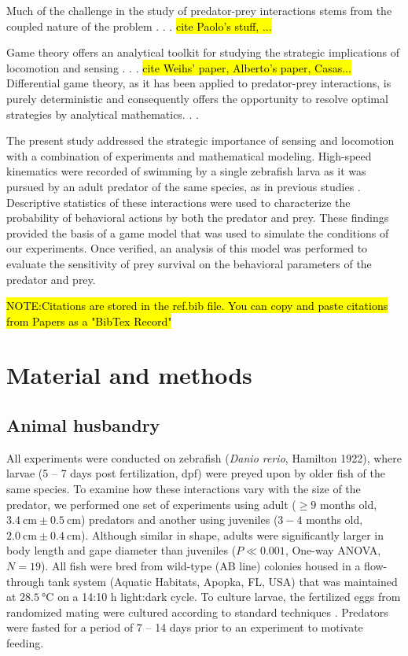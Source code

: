 \documentclass[]{rsos}%
\begin{document}
Much of the challenge in the study of predator-prey interactions stems from the coupled nature of the problem . . . \hl{cite Paolo's stuff, ...}

Game theory offers an analytical toolkit for studying the strategic implications of locomotion and sensing . . .
\hl{cite Weihs' paper, Alberto's paper, Casas...}
Differential game theory, as it has been applied to predator-prey interactions, is purely deterministic and consequently offers the opportunity to resolve optimal strategies by analytical mathematics. . .

The present study addressed the strategic importance of sensing and locomotion with a combination of experiments and mathematical modeling. 
High-speed kinematics were recorded of swimming by a single zebrafish larva as it was pursued by an adult predator of the same species, as in previous studies \cite{Stewart:2014cma, Soto:2015cj}.
Descriptive statistics of these interactions were used to characterize the probability of behavioral actions by both the predator and prey.
These findings provided the basis of a game model that was used to simulate the conditions of our experiments. 
Once verified, an analysis of this model was performed to evaluate the sensitivity of prey survival on the behavioral parameters of the predator and prey.

\hl{NOTE:Citations are stored in the ref.bib file.  You can copy and paste citations from Papers as a "BibTex Record"}

\section{Material and methods}

\subsection{Animal husbandry}
All experiments were conducted on zebrafish (\textit{Danio rerio}, Hamilton 1922), where larvae (5 -- 7 days post fertilization, dpf) were preyed upon by older fish of the same species. 
To examine how these interactions vary with the size of the predator, we performed one set of experiments using adult ($\geq 9$ months old, $\SI{3.4}{\cm} \pm \SI{0.5}{\cm}$) predators and another using juveniles  ($3-4$ months old, $\SI{2.0}{\cm}  \pm  \SI{0.4}{\cm}$). 
Although similar in shape, adults were significantly larger in body length and gape diameter than juveniles ($P \ll 0.001$, One-way ANOVA, $N = 19$).
All fish were bred from wild-type (AB line) colonies housed in a flow-through tank system (Aquatic Habitats, Apopka, FL, USA) that was maintained at $\SI{28.5}{\celsius}$ on a 14:10 h light:dark cycle. 
To culture larvae, the fertilized eggs from randomized mating were cultured according to standard techniques \cite{Westerfield:UXiBrEuA}.
Predators were fasted for a period of 7 -- 14 days prior to an experiment to motivate feeding.
\end{document}
